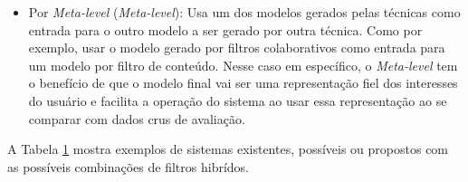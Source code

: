 \begin{itemize}
    \item Por \textit{Meta-level} (\textit{Meta-level}): Usa um dos modelos gerados pelas técnicas como entrada 
    para o outro modelo a ser gerado por outra técnica.
    Como por exemplo, usar o modelo gerado por filtros colaborativos como entrada para um modelo por filtro de conteúdo.
    Nesse caso em específico, o \textit{Meta-level} tem o benefício de que o modelo final vai ser uma representação fiel
    dos interesses do usuário e facilita a operação do sistema ao usar essa representação ao se comparar com dados crus 
    de avaliação.
\end{itemize}

A Tabela \hyperref[tab:1]{1} mostra exemplos de sistemas existentes, possíveis ou propostos com as possíveis combinações de 
filtros hibrídos.

